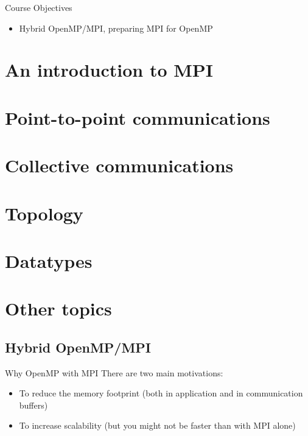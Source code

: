 \documentclass[aspectratio=43]{beamer}
\begin{document}
\cscstitle

\begin{frame}{Course Objectives}
\begin{itemize}
\item Hybrid OpenMP/MPI, preparing MPI for OpenMP
\end{itemize}
\end{frame}


\section{An introduction to MPI}
\section{Point-to-point communications}
\section{Collective communications}
\section{Topology}
\section{Datatypes}
\section{Other topics}


\subsection{Hybrid OpenMP/MPI}

\begin{frame}[fragile]{Why OpenMP with MPI}
There are two main motivations:
\begin{itemize}
\item To reduce the memory footprint (both in application and in communication buffers)
\item To increase scalability (but you might not be faster than with MPI alone)
\end{itemize}
\end{frame}
\end{document}
